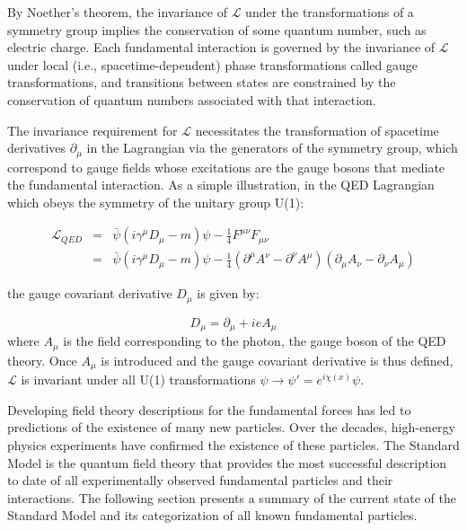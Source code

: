 By Noether's theorem, the invariance of $\mathcal{L}$ under the transformations of a symmetry group implies the conservation of some quantum number, such as electric charge. Each fundamental interaction is governed by the invariance of $\mathcal{L}$ under local (i.e., spacetime-dependent) phase transformations called gauge transformations, and transitions between states are constrained by the conservation of quantum numbers associated with that interaction.

The invariance requirement for $\mathcal{L}$ necessitates the transformation of spacetime derivatives $\partial_{\mu}$ in the Lagrangian via the generators of the symmetry group, which correspond to gauge fields whose excitations are the gauge bosons that mediate the fundamental interaction. As a simple illustration, in the QED Lagrangian which obeys the symmetry of the unitary group U(1):

\begin{eqnarray}
\mathcal{L}_{QED} &=& \bar{\psi}(i\gamma^{\mu}D_{\mu} - m)\psi -\frac{1}{4}F^{\mu\nu}F_{\mu\nu} \nonumber \\
    &=& \bar{\psi}(i\gamma^{\mu}D_{\mu} - m)\psi -\frac{1}{4}(\partial^{\mu}A^{\nu} - \partial^{\nu}A^{\mu})(\partial_{\mu}A_{\nu} - \partial_{\nu}A_{\mu})
\label{eq:QEDLagrangian}
\end{eqnarray}

the gauge covariant derivative $D_{\mu}$ is given by:

\begin{equation}
D_{\mu} = \partial_{\mu} + ieA_{\mu}
\label{eq:covariant-derivative}
\end{equation}
where $A_{\mu}$ is the field corresponding to the photon, the gauge boson of the QED theory. Once $A_{\mu}$ is introduced and the gauge covariant derivative is thus defined, $\mathcal{L}$ is invariant under all U(1) transformations $\psi \rightarrow \psi' = e^{i\chi(x)}\psi$.

Developing field theory descriptions for the fundamental forces has led to predictions of the existence of many new particles. Over the decades, high-energy physics experiments have confirmed the existence of these particles. The Standard Model is the quantum field theory that provides the most successful description to date of all experimentally observed fundamental particles and their interactions. The following section presents a summary of the current state of the Standard Model and its categorization of all known fundamental particles.

